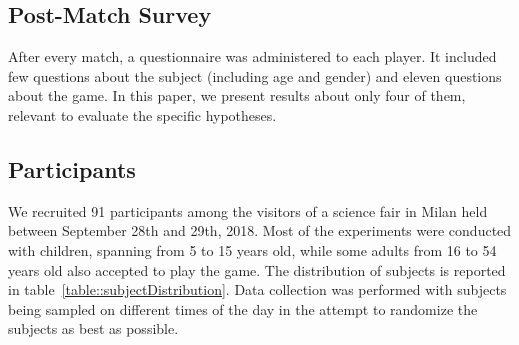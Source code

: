 

\subsection{Post-Match Survey}

After every match, a questionnaire was administered to each player. It included few questions about the subject (including age and gender) and eleven questions about the game. In this paper, we present results about only four of them, relevant to evaluate the specific hypotheses. %

\subsection{Participants}
We recruited 91 participants among the visitors of a science fair in Milan held between September 28th and 29th, 2018. Most of the experiments were conducted with children, spanning from 5 to 15 years old, while some adults from 16 to 54 years old also accepted to play the game. The distribution of subjects is reported in table~\ref{table::subjectDistribution}. Data collection was performed with subjects being sampled on different times of the day in the attempt to randomize the subjects as best as possible. 

